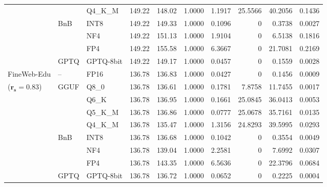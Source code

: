 \begin{longtable}{ll l rrrrrrr}
 &  & Q4\_K\_M & 149.22 & 148.02 & 1.0000 & 1.1917 & 25.5566 & 40.2056 & 0.1436 \\
 & BnB & INT8 & 149.22 & 149.33 & 1.0000 & 0.1096 & \cellcolor{cyan!12} $0$ & 0.3738 & 0.0027 \\
 &  & NF4 & 149.22 & 151.13 & 1.0000 & 1.9104 & \cellcolor{cyan!12} $0$ & 6.5138 & 0.1816 \\
 &  & FP4 & 149.22 & 155.58 & 1.0000 & 6.3667 & \cellcolor{cyan!12} $0$ & 21.7081 & 0.2169 \\
 & GPTQ & GPTQ-8bit & 149.22 & 149.17 & 1.0000 & 0.0457 & \cellcolor{cyan!12} $0$ & 0.1559 & 0.0028 \\
\midrule
FineWeb-Edu & -- & FP16 & 136.78 & 136.83 & 1.0000 & 0.0427 & \cellcolor{cyan!12} $0$ & 0.1456 & 0.0009 \\
{\small ($\mathbf{r_s{=}0.83}$)} & GGUF & Q8\_0 & 136.78 & 136.61 & 1.0000 & 0.1781 & 7.8758 & 11.7455 & 0.0017 \\
 &  & Q6\_K & 136.78 & 136.95 & 1.0000 & 0.1661 & 25.0845 & 36.0413 & 0.0053 \\
 &  & Q5\_K\_M & 136.78 & 136.86 & 1.0000 & 0.0777 & 25.0678 & 35.7161 & 0.0135 \\
 &  & Q4\_K\_M & 136.78 & 135.47 & 1.0000 & 1.3156 & 24.8293 & 39.5995 & 0.0293 \\
 & BnB & INT8 & 136.78 & 136.68 & 1.0000 & 0.1042 & \cellcolor{cyan!12} $0$ & 0.3554 & 0.0049 \\
 &  & NF4 & 136.78 & 139.04 & 1.0000 & 2.2581 & \cellcolor{cyan!12} $0$ & 7.6992 & 0.0307 \\
 &  & FP4 & 136.78 & 143.35 & 1.0000 & 6.5636 & \cellcolor{cyan!12} $0$ & 22.3796 & 0.0684 \\
 & GPTQ & GPTQ-8bit & 136.78 & 136.72 & 1.0000 & 0.0652 & \cellcolor{cyan!12} $0$ & 0.2225 & 0.0004 \\
\end{longtable}
\endgroup